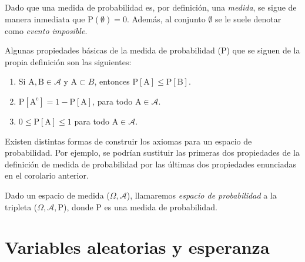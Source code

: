\begin{observacion}
Dado que una medida de probabilidad es, por definición, una \emph{medida}, se sigue de manera inmediata que $\mathrm{P}(\emptyset) = 0$. Además, al conjunto $\emptyset$ se le suele denotar como \emph{evento imposible}.\newline
\end{observacion}

\begin{corolario}\label{cor:propiedades-adicionales}
    Algunas propiedades básicas de la medida de probabilidad ($\mathrm{P}$) que se siguen de la propia definición son las siguientes:

    \begin{enumerate}
        \item Si $\mathrm{A}, \mathrm{B} \in \mathcal{A}$ y $\mathrm{A} \subset B$, entonces $\mathrm{P}[\mathrm{A}] \le \mathrm{P}[\mathrm{B}]$.
        \item $\mathrm{P}[\mathrm{A^c}] = 1-\mathrm{P}[\mathrm{A}]$, para todo $\mathrm{A} \in \mathcal{A}$.
        \item $0 \le \mathrm{P}[\mathrm{A}] \le 1$ para todo $\mathrm{A} \in \mathcal{A}$.\newline
    \end{enumerate}
\end{corolario}

\begin{observacion}
Existen distintas formas de construir los axiomas para un espacio de probabilidad. Por ejemplo, se podrían sustituir las primeras dos propiedades de la definición de medida de probabilidad por las últimas dos propiedades enunciadas en el corolario anterior.\newline
\end{observacion}

\begin{definicion}\label{def:espacio-de-probabilidad}
    Dado un espacio de medida ($\Omega, \mathcal{A}$), llamaremos \emph{espacio de probabilidad} a la tripleta ($\Omega, \mathcal{A}, \mathrm{P}$), donde $\mathrm{P}$ es una medida de probabilidad.\newline
\end{definicion}

\section{Variables aleatorias y esperanza}


